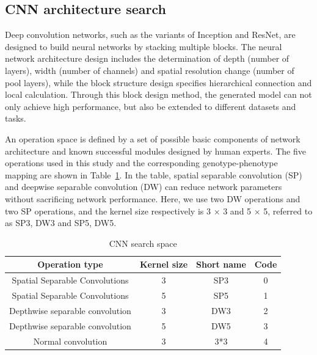 \documentclass[lettersize,journal]{IEEEtran}
\begin{document}
\subsection{CNN architecture search}
Deep convolution networks, such as the variants of Inception and ResNet, are designed to build neural networks by stacking multiple blocks. The neural network architecture design includes the determination of depth (number of layers), width (number of channels) and spatial resolution change (number of pool layers), while the block structure design specifies hierarchical connection and local calculation. Through this block design method, the generated model can not only achieve high performance, but also be extended to different datasets and tasks.

An operation space is defined by a set of possible basic components of network architecture and known successful modules designed by human experts. The five operations used in this study and the corresponding genotype-phenotype mapping are shown in Table~\ref{table2}. In the table, spatial separable convolution (SP) and deepwise separable convolution (DW) can reduce network parameters without sacrificing network performance. Here, we use two DW operations and two SP operations, and the kernel size respectively is 3 × 3 and 5 × 5, referred to as SP3, DW3 and SP5, DW5.

\begin{table}[!t]
\caption{CNN search space\label{table2}}
\centering
\begin{tabular}{cccc}
\hline
Operation type & Kernel size & Short name & Code\\
\hline
Spatial Separable Convolutions	 & 3 & SP3 & 0\\
Spatial Separable Convolutions	 & 5 & SP5 & 1\\
Depthwise separable convolution & 3 & DW3 & 2\\
Depthwise separable convolution & 5 & DW5 & 3\\
Normal convolution & 3 & 3*3 & 4\\
\hline
\end{tabular}
\end{table}
\end{document}
